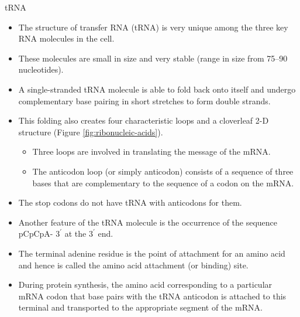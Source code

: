\documentclass[11pt,ignorenonframetext,aspectratio=169]{beamer}
\providecommand{\tightlist}{%
  \setlength{\itemsep}{0pt}\setlength{\parskip}{0pt}}
\begin{document}
\begin{frame}{tRNA}
\protect\hypertarget{trna}{}
\begin{itemize}
\tightlist
\item
  The structure of transfer RNA (tRNA) is very unique among the three
  key RNA molecules in the cell.
\item
  These molecules are small in size and very stable (range in size from
  75--90 nucleotides).
\item
  A single-stranded tRNA molecule is able to fold back onto itself and
  undergo complementary base pairing in short stretches to form double
  strands.
\item
  This folding also creates four characteristic loops and a cloverleaf
  2-D structure (Figure \ref{fig:ribonucleic-acids}).

  \begin{itemize}
  \tightlist
  \item
    Three loops are involved in translating the message of the mRNA.
  \item
    The anticodon loop (or simply anticodon) consists of a sequence of
    three bases that are complementary to the sequence of a codon on the
    mRNA.
  \end{itemize}
\end{itemize}
\end{frame}

\begin{frame}{}
\protect\hypertarget{section-10}{}
\begin{itemize}
\tightlist
\item
  The stop codons do not have tRNA with anticodons for them.
\item
  Another feature of the tRNA molecule is the occurrence of the sequence
  pCpCpA- \(3^\prime\) at the \(3^\prime\) end.
\item
  The terminal adenine residue is the point of attachment for an amino
  acid and hence is called the amino acid attachment (or binding) site.
\item
  During protein synthesis, the amino acid corresponding to a particular
  mRNA codon that base pairs with the tRNA anticodon is attached to this
  terminal and transported to the appropriate segment of the mRNA.
\end{itemize}
\end{frame}
\end{document}
